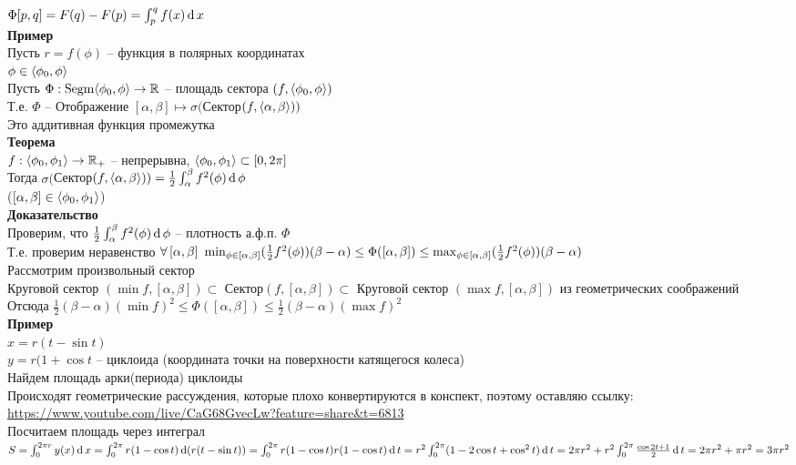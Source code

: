 \documentclass[12pt]{article}
\begin{document}
$\Phi[p,q] = F(q)-F(p) = \int_p^q f(x)\operatorname{d} x$\\
\textbf{Пример}\\
Пусть $r = f(\phi)$ -- функция в полярных координатах\\
$\phi \in \langle \phi_0, \phi \rangle$\\
Пусть $\Phi: \operatorname{Segm}\langle \phi_0, \phi \rangle \rightarrow \mathbb{R}$ -- площадь сектора $(f, \langle \phi_0, \phi \rangle)$\\
Т.е. $\Phi$ -- Отображение $[\alpha, \beta] \mapsto \sigma($Сектор$(f, \langle \alpha, \beta \rangle))$\\
Это аддитивная функция промежутка\\
\textbf{Теорема}\\
$f: \langle \phi_0, \phi_1 \rangle \rightarrow \mathbb{R}_+$ -- непрерывна, $\langle \phi_0, \phi_1 \rangle \subset [0, 2\pi]$\\
Тогда $\sigma($Сектор$(f, \langle \alpha, \beta \rangle)) = \frac12 \int_\alpha^\beta f^2(\phi)\operatorname{d} \phi$\\
($[\alpha, \beta] \in \langle \phi_0, \phi_1 \rangle$)\\
\textbf{Доказательство}\\
Проверим, что $\frac12 \int_\alpha^\beta f^2(\phi)\operatorname{d} \phi$ -- плотность а.ф.п. $\Phi$\\
Т.е. проверим неравенство $\forall\, [\alpha, \beta]\ \min_{\phi \in [\alpha, \beta]}(\frac12 f^2(\phi))(\beta - \alpha) \leq \Phi([\alpha, \beta]) \leq \max_{\phi \in [\alpha, \beta]}(\frac12 f^2(\phi))(\beta - \alpha)$\\
Рассмотрим произвольный сектор\\
Круговой сектор $(\min f, [\alpha, \beta])\subset $ Сектор$(f, [\alpha, \beta])\subset$ Круговой сектор $(\max f, [\alpha, \beta])$ из геометрических соображений\\
Отсюда $\frac12(\beta-\alpha) (\min f)^2 \leq \Phi([\alpha, \beta]) \leq \frac12(\beta - \alpha)(\max f)^2$\\
\textbf{Пример}\\
$x = r(t-\sin t)$\\
$y = r(1 + \cos t$ -- циклоида (координата точки на поверхности катящегося колеса)\\
Найдем площадь арки(периода) циклоиды\\
Происходят геометрические рассуждения, которые плохо конвертируются в конспект, поэтому оставляю ссылку: \url{https://www.youtube.com/live/CaG68GvecLw?feature=share&t=6813}\\
Посчитаем площадь через интеграл\\
$S = \int_0^{2\pi r}y(x)\operatorname{d} x = \int_0^{2\pi} r(1-\cos t)\operatorname{d} (r(t-\sin t)) = \int_0^{2\pi} r(1-\cos t)r(1-\cos t)\operatorname{d} t = r^2\int_0^{2\pi} (1 - 2\cos t + \cos^2t) \operatorname{d} t = 2\pi r^2 + r^2\int_0^{2\pi} \frac{\cos 2t + 1}2 \operatorname{d} t = 2\pi r^2 + \pi r^2 = 3\pi r^2$\\
\end{document}
